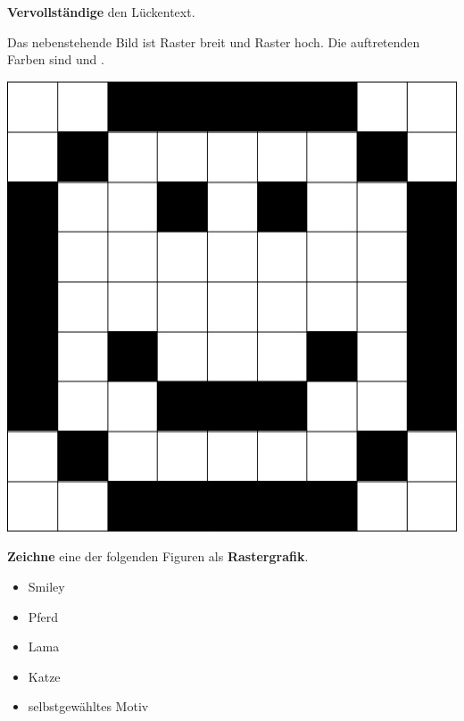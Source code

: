 \documentclass[a4paper, 12pt]{article}
\begin{document}
\TITEL
\begin{LKtext}

\aufgabe{}
	\begin{minipage}{0.65\textwidth}\vspace{0pt}
	\textbf{Vervollständige} den Lückentext.
	
		Das nebenstehende Bild ist  Raster breit und  Raster hoch. Die auftretenden Farben sind \newline und .	
	\end{minipage}
	\hfill
	\begin{minipage}{0.25\textwidth}\vspace{0pt}
		\includegraphics[width=\linewidth]{A_1.png}
	\end{minipage}

\aufgabe{}
	\begin{minipage}{0.65\textwidth}\vspace{0pt}
		\textbf{Zeichne} eine der folgenden Figuren als \textbf{Rastergrafik}.

		\begin{itemize}
			\setlength\itemsep{-0.2em}
			\item Smiley
			\item Pferd
			\item Lama
			\item Katze
			\item selbstgewähltes Motiv
		\end{itemize}


\end{minipage}
\end{LKtext}
\end{document}
